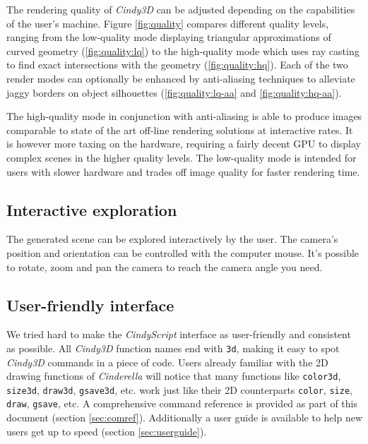 \documentclass[appendixprefix,a4paper]{scrreprt}
\begin{document}
The rendering quality of \emph{Cindy3D} can be adjusted depending on the 
capabilities of the user's machine. Figure \ref{fig:quality} compares 
different quality levels, ranging from the low-quality mode displaying 
triangular approximations of curved geometry (\ref{fig:quality:lq}) to 
the high-quality mode which uses ray casting to find exact intersections 
with the geometry (\ref{fig:quality:hq}). Each of the two render modes can 
optionally be enhanced by anti-aliasing techniques to alleviate jaggy borders 
on object silhouettes (\ref{fig:quality:lq-aa} and \ref{fig:quality:hq-aa}).

The high-quality mode in conjunction with anti-aliasing is able to produce 
images comparable to state of the art off-line rendering solutions at 
interactive rates. It is however more taxing on the hardware, requiring a 
fairly decent GPU to display complex scenes in the higher quality levels. The 
low-quality mode is intended for users with slower hardware and trades off 
image quality for faster rendering time.

\subsection{Interactive exploration}

The generated scene can be explored interactively by the user. The camera's 
position and orientation can be controlled with the computer mouse. It's 
possible to rotate, zoom and pan the camera to reach the camera angle you need.

\subsection{User-friendly interface}

We tried hard to make the \emph{CindyScript} interface as user-friendly and 
consistent as possible. All \emph{Cindy3D} function names end with 
\texttt{3d}, making it easy to spot \emph{Cindy3D} commands in a piece of 
code. Users already familiar with the 2D drawing functions of 
\emph{Cinderella} will notice that many functions like \texttt{color3d}, 
\texttt{size3d}, \texttt{draw3d}, \texttt{gsave3d}, etc. work just like their 
2D counterparts \texttt{color}, \texttt{size}, \texttt{draw}, 
\texttt{gsave}, etc. A comprehensive command reference is provided as part of 
this document (section \ref{sec:comref}). Additionally a user guide is 
available to help new users get up to speed (section \ref{sec:userguide}).
\end{document}
